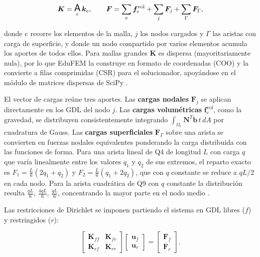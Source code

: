 \begin{equation}
\bm{K} = \operatorname*{\text{\Large\textsf{A}}}_{e} \bm{k}_e, \qquad
\bm{F} = \sum_e \bm{f}_e^{\text{vol}} + \sum_j \bm{F}_j + \sum_\Gamma \bm{F}_\Gamma,
\label{eq:ensamblaje}
\end{equation}

donde $e$ recorre los elementos de la malla, $j$ los nodos cargados y $\Gamma$ las aristas con carga de superficie, y donde un nodo compartido por varios elementos acumula los aportes de todos ellos. Para mallas grandes $\bm{K}$ es dispersa (mayoritariamente nula), por lo que EduFEM la construye en formato de coordenadas (COO) y la convierte a filas comprimidas (CSR) para el solucionador, apoyándose en el módulo de matrices dispersas de SciPy \autocite[p.~265]{virtanen2020scipy}.

El vector de cargas reúne tres aportes. Las \textbf{cargas nodales} $\bm{F}_j$ se aplican directamente en los GDL del nodo $j$. Las \textbf{cargas volumétricas} $\bm{f}_e^{\text{vol}}$, como la gravedad, se distribuyen consistentemente integrando $\int_{\Omega_e} \bm{N}^T \bm{b}\, t\, dA$ por cuadratura de Gauss. Las \textbf{cargas superficiales} $\bm{F}_\Gamma$ sobre una arista se convierten en fuerzas nodales equivalentes ponderando la carga distribuida con las funciones de forma. Para una arista lineal de Q4 de longitud $L$ con carga $q$ que varía linealmente entre los valores $q_1$ y $q_2$ de sus extremos, el reparto exacto es $F_1 = \tfrac{L}{6}(2q_1 + q_2)$ y $F_2 = \tfrac{L}{6}(q_1 + 2q_2)$, que con $q$ constante se reduce a $qL/2$ en cada nodo. Para la arista cuadrática de Q9 con $q$ constante la distribución resulta $\tfrac{qL}{6},\,\tfrac{4qL}{6},\,\tfrac{qL}{6}$, concentrando la mayor parte en el nodo medio \autocite[p.~113]{cook2002concepts}.

Las restricciones de Dirichlet se imponen partiendo el sistema en GDL libres ($f$) y restringidos ($r$):

\begin{equation}
\begin{bmatrix} \bm{K}_{ff} & \bm{K}_{fr} \\ \bm{K}_{rf} & \bm{K}_{rr} \end{bmatrix}
\begin{bmatrix} \bm{u}_f \\ \bm{u}_r \end{bmatrix}
=
\begin{bmatrix} \bm{F}_f \\ \bm{F}_r \end{bmatrix}.
\label{eq:particion}
\end{equation}

